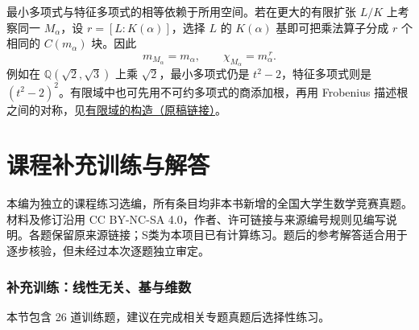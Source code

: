 \documentclass[UTF8,12pt,a4paper,fontset=fandol]{ctexart}
\begin{document}
最小多项式与特征多项式的相等依赖于所用空间。若在更大的有限扩张 $L/K$ 上考察同一 $M_\alpha$，设 $r=[L:K(\alpha)]$，选择 $L$ 的 $K(\alpha)$ 基即可把乘法算子分成 $r$ 个相同的 $C(m_\alpha)$ 块。因此
\[
m_{M_\alpha}=m_\alpha,\qquad
\chi_{M_\alpha}=m_\alpha^{\,r}.
\]
例如在 $\mathbb Q(\sqrt2,\sqrt3)$ 上乘 $\sqrt2$，最小多项式仍是 $t^2-2$，特征多项式则是 $(t^2-2)^2$。有限域中也可先用不可约多项式的商添加根，再用 Frobenius 描述根之间的对称，见\href{https://github.com/lzxcr/cmc-mathematics/blob/64916fa1fdbc3e444a652eca204d5669058ee321/src/methods/outer/01-algebra.md}{有限域的构造（原稿链接）}。

\part{课程补充训练与解答}

本编为独立的课程练习选编，所有条目均非本书新增的全国大学生数学竞赛真题。材料及修订沿用 CC BY-NC-SA 4.0，作者、许可链接与来源编号规则见编写说明。各题保留原来源链接；S类为本项目已有计算练习。题后的参考解答适合用于逐步核验，但未经过本次逐题独立审定。

\section{补充训练：线性无关、基与维数}

本节包含 26 道训练题，建议在完成相关专题真题后选择性练习。
\end{document}
